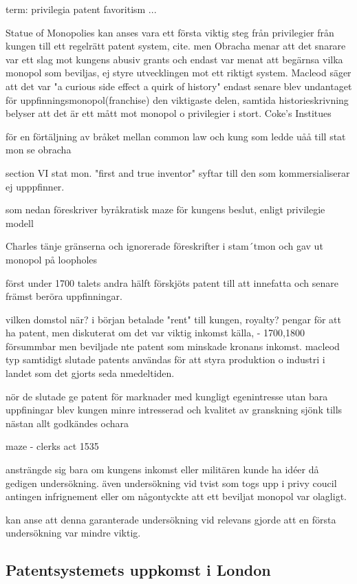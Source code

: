 term: privilegia patent
favoritism
...

Statue of Monopolies kan anses vara ett första viktig steg från privilegier från kungen till ett regelrätt patent system, cite. men Obracha menar att det snarare var ett slag mot kungens abusiv grants och endast var menat att begärnsa vilka monopol som beviljas, ej styre utvecklingen mot ett riktigt system. Macleod säger att det var "a curious side effect a quirk of history" endast senare blev undantaget för uppfinningsmonopol(franchise) den viktigaste delen, samtida historieskrivning belyser att det är ett mått mot monopol o privilegier i stort. Coke's Institues

för en förtäljning av bråket mellan common law och kung som ledde uåå till stat mon se obracha

section VI stat mon. 
"first and true inventor" syftar till den som kommersialiserar ej upppfinner.

som nedan föreskriver byråkratisk maze för kungens beslut, enligt privilegie modell

Charles tänje gränserna och ignorerade föreskrifter i stam´tmon och gav ut monopol på loopholes

först under 1700 talets andra hälft förskjöts patent till att innefatta och senare främst beröra uppfinningar.

vilken domstol när?
i början betalade "rent" till kungen, royalty? pengar för att ha patent, men diskuterat om det var viktig inkomst källa,
- 1700,1800 försummbar men beviljade nte patent som minskade kronans inkomst. macleod 
typ samtidigt slutade patents användas för att styra produktion o industri i landet som det gjorts seda nmedeltiden.

nör de slutade ge patent för marknader med kungligt egenintresse utan bara uppfiningar blev kungen minre intresserad och kvalitet av granskning sjönk tills nästan allt godkändes ochara

maze - clerks act 1535

ansträngde sig bara om kungens inkomst eller militären kunde ha idéer då gedigen undersökning.
även undersökning vid tvist som togs upp i privy coucil antingen infrignement eller om någontyckte att ett beviljat monopol var olagligt.

kan anse att denna garanterade undersökning vid relevans gjorde att en första undersökning var mindre viktig.


\subsection{Patentsystemets uppkomst i London} %
\label{sub:patentsystemets_uppkomst_i_london}


